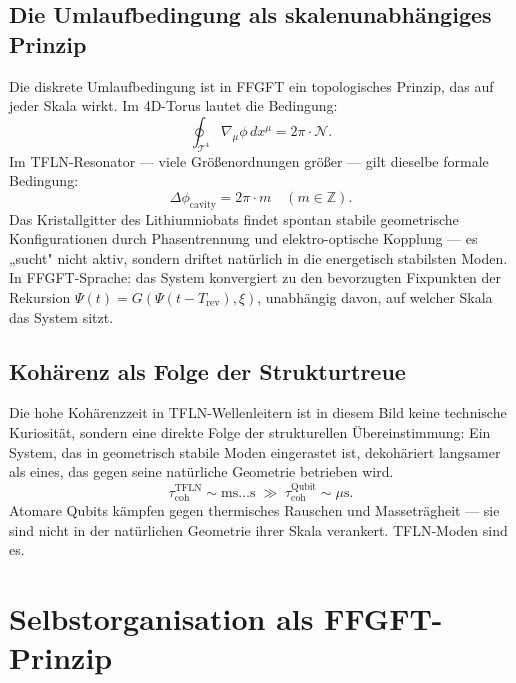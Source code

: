 \subsection{Die Umlaufbedingung als skalenunabhängiges Prinzip}

Die diskrete Umlaufbedingung ist in FFGFT ein topologisches Prinzip, das
auf jeder Skala wirkt. Im 4D-Torus lautet die Bedingung:
\begin{equation}
  \oint_{\mathcal{T}^4} \nabla_{\mu}\phi\,dx^\mu = 2\pi\cdot\mathcal{N}.
\end{equation}
Im TFLN-Resonator — viele Größenordnungen größer — gilt dieselbe
formale Bedingung:
\begin{equation}
  \Delta\phi_{\text{cavity}} = 2\pi\cdot m \quad (m \in \mathbb{Z}).
\end{equation}
Das Kristallgitter des Lithiumniobats findet spontan stabile geometrische
Konfigurationen durch Phasentrennung und elektro-optische Kopplung —
es „sucht" nicht aktiv, sondern driftet natürlich in die energetisch
stabilsten Moden. In FFGFT-Sprache: das System konvergiert zu den
bevorzugten Fixpunkten der Rekursion $\Psi(t) = G(\Psi(t-T_{\text{rev}}), \xi)$,
unabhängig davon, auf welcher Skala das System sitzt.

\subsection{Kohärenz als Folge der Strukturtreue}

Die hohe Kohärenzzeit in TFLN-Wellenleitern ist in diesem Bild keine
technische Kuriosität, sondern eine direkte Folge der strukturellen
Übereinstimmung: Ein System, das in geometrisch stabile Moden eingerastet
ist, dekohäriert langsamer als eines, das gegen seine natürliche Geometrie
betrieben wird.
\begin{equation}
  \tau_{\text{coh}}^{\text{TFLN}} \sim \text{ms}\ldots\text{s}
  \;\gg\;
  \tau_{\text{coh}}^{\text{Qubit}} \sim \mu\text{s}.
\end{equation}
Atomare Qubits kämpfen gegen thermisches Rauschen und Masseträgheit —
sie sind nicht in der natürlichen Geometrie ihrer Skala verankert.
TFLN-Moden sind es.

\section{Selbstorganisation als FFGFT-Prinzip}


